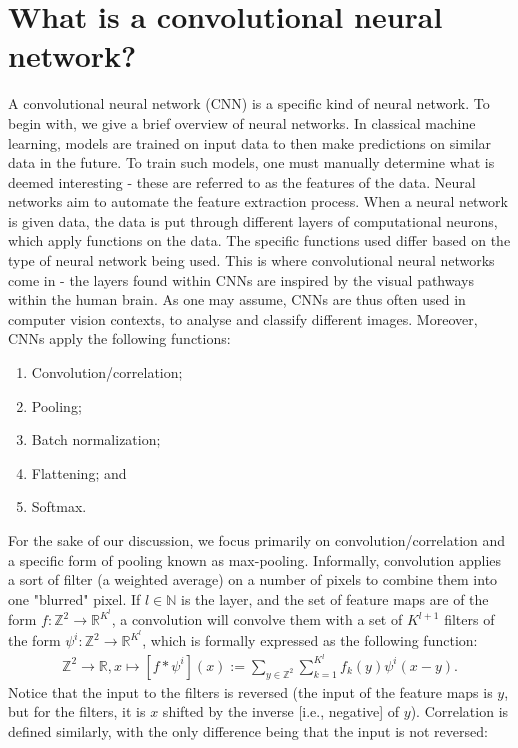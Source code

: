 \documentclass{article}
\begin{document}
\section{What is a convolutional neural network?}
    A convolutional neural network (CNN) is a specific kind of neural network. To begin with, we give a brief overview of neural networks. In classical machine learning, models are trained on input data to then make predictions on similar data in the future. To train such models, one must manually determine what is deemed interesting - these are referred to as the features of the data. Neural networks aim to automate the feature extraction process. When a neural network is given data, the data is put through different layers of computational neurons, which apply functions on the data. The specific functions used differ based on the type of neural network being used. This is where convolutional neural networks come in - the layers found within CNNs are inspired by the visual pathways within the human brain. As one may assume, CNNs are thus often used in computer vision contexts, to analyse and classify different images. Moreover, CNNs apply the following functions:
    \begin{enumerate}
        \item Convolution/correlation;
        \item Pooling;
        \item Batch normalization;
        \item Flattening; and
        \item Softmax.
    \end{enumerate}
    For the sake of our discussion, we focus primarily on convolution/correlation and a specific form of pooling known as max-pooling. Informally, convolution applies a sort of filter (a weighted average) on a number of pixels to combine them into one "blurred" pixel. If \(l \in \mathbb{N}\) is the layer, and the set of feature maps are of the form \(f: \mathbb{Z}^2 \to \mathbb{R}^{K^l}\), a convolution will convolve them with a set of \(K^{l + 1}\) filters of the form \(\psi^i: \mathbb{Z}^2 \to \mathbb{R}^{K^l}\), which is formally expressed as the following function:
    \begin{align*}
        \mathbb{Z}^2 \to \mathbb{R}, x \mapsto [f * \psi^i](x) := \sum_{y \in \mathbb{Z}^2} \sum_{k = 1}^{K^l} f_k(y)\psi^i(x - y).
    \end{align*}
    Notice that the input to the filters is reversed (the input of the feature maps is \(y\), but for the filters, it is \(x\) shifted by the inverse [i.e., negative] of \(y\)). Correlation is defined similarly, with the only difference being that the input is not reversed:
\end{document}
